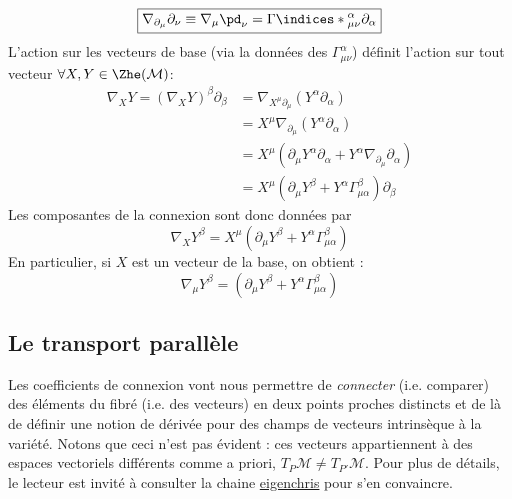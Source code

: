 \begin{equation}
    \boxed{\nabla_{\partial_{\mu}}\partial_{\nu} \equiv \nabla_\mu \pd_\nu = \Gamma\indices*{^{\alpha}_{\mu \nu}}\partial_{\alpha}}
\end{equation}
L'action sur les vecteurs de base (via la données des $\Gamma^{\alpha}_{\mu \nu}$) définit l'action sur tout vecteur
$\forall X,Y\in \Zhe(\mathcal{M})$:
\begin{align}
     \nabla_{X}Y =(\nabla_{X}Y)^{\beta}\partial_{\beta} &=  \nabla_{X^{\mu}\partial_{\mu}}(Y^{\alpha}\partial_{\alpha})\\
     &= X^{\mu}\nabla_{\partial_{\mu}}(Y^{\alpha}\partial_{\alpha}) \\
     &= X^{\mu}(\partial_{\mu}Y^{\alpha}\partial_{\alpha} + Y^{\alpha}\nabla_{\partial_{\mu}}\partial_{\alpha})\\
     &=X^{\mu}(\partial_{\mu}Y^{\beta} + Y^{\alpha}\Gamma^{\beta}_{\mu \alpha})\partial_{\beta}
\end{align}
Les composantes de la connexion sont donc données par
\begin{equation}
    \boxed{\nabla_{X}Y^{\beta} = X^\mu (\partial_{\mu}Y^{\beta} + Y^{\alpha}\Gamma^{\beta}_{\mu \alpha})}
    \label{def: dérivée covariante vecteur}
\end{equation}
En particulier, si $X$ est un vecteur de la base, on obtient :
\begin{equation} 
    \nabla_{\mu}Y^{\beta} = (\partial_{\mu}Y^{\beta} + Y^{\alpha}\Gamma^{\beta}_{\mu \alpha})
\end{equation}
\subsection{Le transport parallèle}

Les coefficients de connexion vont nous permettre de \emph{connecter} (i.e. comparer) des éléments du fibré (i.e. des vecteurs) en deux points proches distincts et de là de définir une notion de dérivée pour des champs de vecteurs intrinsèque à la variété. Notons que ceci n'est pas évident : ces vecteurs appartiennent à des espaces vectoriels différents comme a priori, $T_P\mathcal{M} \neq T_{P'}\mathcal{M}$. Pour plus de détails, le lecteur est invité à consulter la chaine \href{https://youtu.be/Af9JUiQtV1k?si=gT3A0wMGmJmEb9g0}{eigenchris} pour s'en convaincre. 


